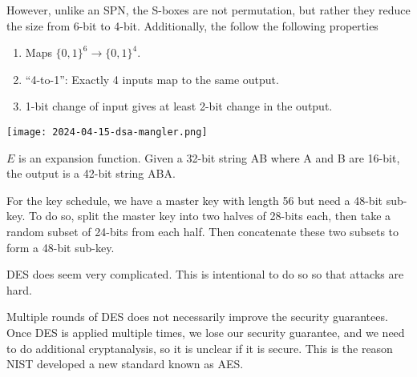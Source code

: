 However, unlike an SPN, the S-boxes are not permutation, but rather they reduce the size from 6-bit to 4-bit. Additionally, the follow the following properties
\begin{enumerate}
    \item Maps $\{0, 1\}^6 \to \{0, 1\}^4$.
    \item ``4-to-1'': Exactly 4 inputs map to the same output.
    \item 1-bit change of input gives at least 2-bit change in the output.
\end{enumerate}

\begin{center}
    \texttt{[image: 2024-04-15-dsa-mangler.png]}
\end{center}

$E$ is an expansion function. Given a 32-bit string AB where A and B are 16-bit, the output is a 42-bit string ABA.

For the key schedule, we have a master key with length 56 but need a 48-bit sub-key. To do so, split the master key into two halves of 28-bits each, then take a random subset of 24-bits from each half. Then concatenate these two subsets to form a 48-bit sub-key.

\begin{remark}
    DES does seem very complicated. This is intentional to do so so that attacks are hard.

    Multiple rounds of DES does not necessarily improve the security guarantees. Once DES is applied multiple times, we lose our security guarantee, and we need to do additional cryptanalysis, so it is unclear if it is secure. This is the reason NIST developed a new standard known as AES.
\end{remark}